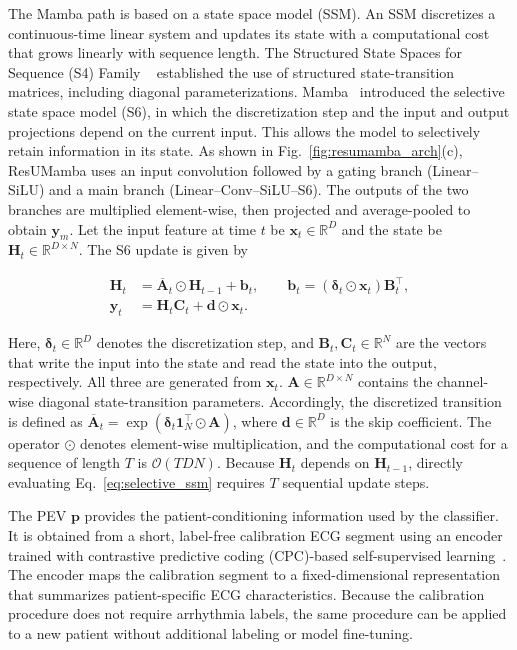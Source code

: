 The Mamba path is based on a state space model (SSM).
An SSM discretizes a continuous-time linear system and updates its state with a computational cost that grows linearly with sequence length.
The Structured State Spaces for Sequence (S4) Family ~\cite{gu2021s4,gu2022parameterization} established the use of structured state-transition matrices, including diagonal parameterizations.
Mamba~\cite{gu2023mamba} introduced the selective state space model (S6), in which the discretization step and the input and output projections depend on the current input.
This allows the model to selectively retain information in its state.
As shown in Fig.~\ref{fig:resumamba_arch}(c), ResUMamba uses an input convolution followed by a gating branch (Linear--SiLU) and a main branch (Linear--Conv--SiLU--S6).
The outputs of the two branches are multiplied element-wise, then projected and average-pooled to obtain $\mathbf{y}_{m}$.
Let the input feature at time $t$ be $\mathbf{x}_t\in\mathbb{R}^{D}$ and the state be $\mathbf{H}_t\in\mathbb{R}^{D\times N}$.
The S6 update is given by

\begin{equation}
\begin{aligned}
\mathbf{H}_t &= \overline{\mathbf{A}}_t\odot\mathbf{H}_{t-1} + \mathbf{b}_t,
\qquad \mathbf{b}_t=(\boldsymbol{\delta}_t\odot\mathbf{x}_t)\mathbf{B}_t^{\top}, \\
\mathbf{y}_t &= \mathbf{H}_t\mathbf{C}_t + \mathbf{d}\odot\mathbf{x}_t.
\end{aligned}
\label{eq:selective_ssm}
\end{equation}

Here, $\boldsymbol{\delta}_t\in\mathbb{R}^{D}$ denotes the discretization step, and $\mathbf{B}_t,\mathbf{C}_t\in\mathbb{R}^{N}$ are the vectors that write the input into the state and read the state into the output, respectively.
All three are generated from $\mathbf{x}_t$.
$\mathbf{A}\in\mathbb{R}^{D\times N}$ contains the channel-wise diagonal state-transition parameters.
Accordingly, the discretized transition is defined as
$\overline{\mathbf{A}}_t=\exp(\boldsymbol{\delta}_t\mathbf{1}_N^{\top}\odot\mathbf{A})$,
where $\mathbf{d}\in\mathbb{R}^{D}$ is the skip coefficient.
The operator $\odot$ denotes element-wise multiplication, and the computational cost for a sequence of length $T$ is $\mathcal{O}(TDN)$.
Because $\mathbf{H}_t$ depends on $\mathbf{H}_{t-1}$, directly evaluating Eq.~\eqref{eq:selective_ssm} requires $T$ sequential update steps.


The PEV $\mathbf{p}$ provides the patient-conditioning information used
by the classifier.
It is obtained from a short, label-free calibration ECG segment using
an encoder trained with contrastive predictive coding (CPC)-based
self-supervised learning~\cite{oord2018cpc}.
The encoder maps the calibration segment to a fixed-dimensional
representation that summarizes patient-specific ECG characteristics.
Because the calibration procedure does not require arrhythmia labels,
the same procedure can be applied to a new patient without additional
labeling or model fine-tuning.




